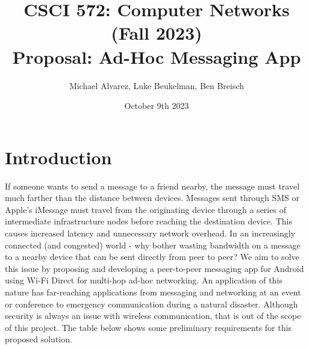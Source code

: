 \documentclass[10pt]{article}
\title{{\normalsize CSCI 572: Computer Networks (Fall 2023)}\\Proposal: Ad-Hoc Messaging App}
\author{Michael Alvarez, Luke Beukelman, Ben Breisch}
\date{October 9th 2023}
\begin{document}
\maketitle

\section{Introduction}
If someone wants to send a message to a friend nearby, the message must travel much farther than the distance between devices. Messages sent through SMS or Apple's iMessage must travel from the originating device through a series of intermediate infrastructure nodes before reaching the destination device. This causes increased latency and unnecessary network overhead. In an increasingly connected (and congested) world - why bother wasting bandwidth on a message to a nearby device that can be sent directly from peer to peer? We aim to solve this issue by proposing and developing a peer-to-peer messaging app for Android using Wi-Fi Direct for multi-hop ad-hoc networking. An application of this nature has far-reaching applications from messaging and networking at an event or conference to emergency communication during a natural disaster. Although security is always an issue with wireless communication, that is out of the scope of this project. The table below shows some preliminary requirements for this proposed solution.
\end{document}
